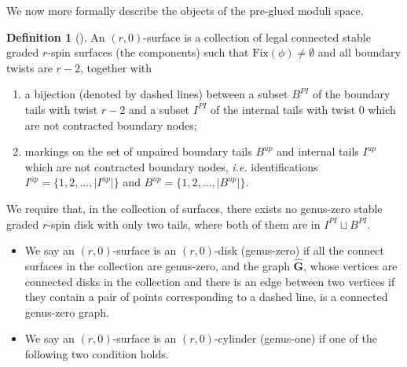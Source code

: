 \documentclass[11pt]{amsart}
\theoremstyle{definition}
\newtheorem{dfn}[dummy]{Definition}
\theoremstyle{remark}
\newcommand{\<}{\left<}
\renewcommand{\>}{\right>}
\numberwithin{equation}{section}
\begin{document}
We %
now more formally describe the objects of the pre-glued moduli space.
\begin{dfn}[{\cite[Definition 4.3]{TZ1}}]\label{dfn rh disk}
    An $(r,0)$-surface is a collection of legal connected  stable graded $r$-spin surfaces (the components) such that $\text{Fix}(\phi)\ne \emptyset$ and all boundary twists are %
$r-2$, together %
with
    \begin{enumerate}
        \item a bijection (denoted by dashed lines) between a subset $B^{PI}$ of the boundary tails with twist $r-2$ and a subset $I^{PI}$ of the internal tails with twist $0$ which are not contracted boundary nodes;
        \item markings on the set of unpaired boundary tails $B^{up}$ and internal tails $I^{up}$ which are not contracted boundary %
nodes, \textit{i.e.} identifications %
$I^{up}=\{1,2,\dots,\lvert I^{up}\rvert\}$ and $B^{up}=\{1,2,\dots,\lvert B^{up}\rvert\}$.
    \end{enumerate}
    We require that, in the collection of surfaces, there exists no genus-zero stable graded $r$-spin disk with only %
two tails, where %
both of them are in $I^{PI}\sqcup B^{PI}$.
    \begin{itemize}
        \item  We say an $(r,0)$-surface is an $(r,0)$-disk (genus-zero) if all %
the connect surfaces %
in the collection %
are genus-zero, and %
the graph $\hat{\mathbf{G}}$, whose vertices are connected disks in the collection and there is an edge between two vertices if they contain a pair of points corresponding to a dashed line, is a connected genus-zero graph.
        \item  We say an $(r,0)$-surface is an $(r,0)$-cylinder (genus-one) if one of the following two condition holds. 

\end{itemize}
\end{dfn}
\end{document}
